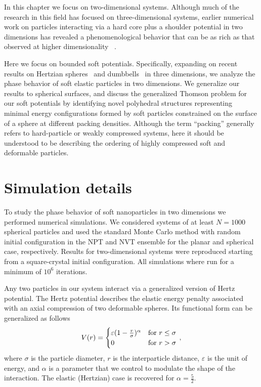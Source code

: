In this chapter we focus on two-dimensional systems.
Although much of the research in this field has focused on three-dimensional systems,
earlier numerical work on particles interacting via a hard core plus a shoulder potential
in two dimensions has revealed 
a phenomenological behavior that can be as rich as that observed at higher dimensionality
~\cite{Malescio,Stell,jagla,glaser}. 

Here we focus on  bounded soft potentials. Specifically, expanding on recent results 
on Hertzian spheres~\cite{pephertz} and dumbbells~\cite{saric2} in three dimensions, we analyze the phase behavior of soft
elastic particles in two dimensions. We generalize our results to spherical surfaces,  and 
discuss the generalized Thomson problem for our soft potentials  by identifying novel polyhedral structures
representing minimal energy configurations formed by soft particles constrained on the surface of a sphere at different packing densities.
{Although the term ``packing'' generally refers to hard-particle or weakly compressed systems, here it should be understood to be describing the ordering of highly compressed soft and deformable particles.}

\section{Simulation details}
To study the phase behavior of soft nanoparticles in two dimensions we performed numerical simulations.
We considered systems of at least $N=1000$ spherical particles and used the 
standard Monte Carlo method {with random initial configuration} in the NPT and NVT ensemble for the planar and spherical case, respectively.
{Results for two-dimensional systems were reproduced starting from a square-crystal initial configuration.}
All simulations where run for a minimum of $10^6$ iterations.

Any two particles in our system interact
via a generalized version of Hertz potential. The Hertz potential describes the elastic energy penalty associated with an axial compression
of two deformable spheres. Its functional form can be generalized as follows
 \begin{equation} \label{Hertz}
	V(r)= 
		\begin{cases}
  			\varepsilon(1-\frac{r}{\sigma})^{\alpha} & \text{for } r \leq \sigma\cr
			0 & \text{for } r  > \sigma\cr
		\end{cases} \,,
\end{equation}
where $\sigma$ is the particle diameter, $r$ is the interparticle distance, $\varepsilon$ is the unit of energy, 
and $\alpha$ is a 
parameter that we control to modulate the shape of the interaction. The elastic (Hertzian)
case is recovered for $\alpha=\frac{5}{2}$. 

